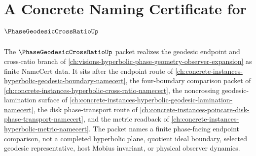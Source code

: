 \chapter{A Concrete Naming Certificate for $\PhaseGeodesicCrossRatioUp$}
\label{ch:concrete-instances-phase-geodesic-cross-ratio-namecert}

The $\PhaseGeodesicCrossRatioUp$ packet realizes the geodesic endpoint and cross-ratio branch of \autoref{ch:visions-hyperbolic-phase-geometry-observer-expansion} as finite NameCert data. It sits after the endpoint route of \autoref{ch:concrete-instances-hyperbolic-geodesic-boundary-namecert}, the four-boundary comparison packet of \autoref{ch:concrete-instances-hyperbolic-cross-ratio-namecert}, the noncrossing geodesic-lamination surface of \autoref{ch:concrete-instances-hyperbolic-geodesic-lamination-namecert}, the disk phase-transport route of \autoref{ch:concrete-instances-poincare-disk-phase-transport-namecert}, and the metric readback of \autoref{ch:concrete-instances-hyperbolic-metric-namecert}. The packet names a finite phase-facing endpoint comparison, not a completed hyperbolic plane, quotient ideal boundary, selected geodesic representative, host Mobius invariant, or physical observer dynamics.

